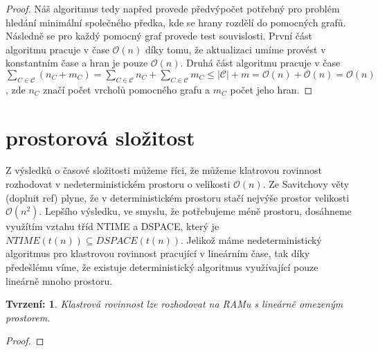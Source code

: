 \documentclass[12pt,a4report]{report}
\newtheorem{tvr}{Tvrzení: }[chapter]
\begin{document}
\begin{proof}
Náš algoritmus tedy napřed provede předvýpočet potřebný pro problém hledání minimální společného předka, kde se hrany rozdělí do pomocných grafů. Následně se pro každý pomocný graf provede test souvislosti. První část algoritmu pracuje v čase $\mathcal{O}(n)$ díky tomu, že aktualizaci umíme provést v konstantním čase a hran je pouze $\mathcal{O}(n)$. Druhá část algoritmu pracuje v čase $\sum\limits_{C \in \mathcal C}(n_C+m_C) = \sum\limits_{C \in \mathcal C}n_C + \sum\limits_{C \in \mathcal C}m_C \leq |\mathcal C| + m = \mathcal O(n) + \mathcal O(n)=\mathcal O(n)$, zde $n_C$ značí počet vrcholů pomocného grafu a $m_C$ počet jeho hran.
\end{proof}

\section{prostorová složitost}
Z výsledků o časové složitosti můžeme říci, že můžeme klatrovou rovinnost rozhodovat v nedeterministickém prostoru o velikosti $\mathcal{O}(n)$. Ze Savitchovy věty (doplnit ref) plyne, že v deterministickém prostoru stačí nejvýše prostor velikosti $\mathcal{O}(n^2)$.
Lepšího výsledku, ve smyslu, že potřebujeme méně prostoru, dosáhneme využítím vztahu tříd NTIME a DSPACE, který je $NTIME(t(n)) \subseteq DSPACE(t(n))$. Jelikož máme nedeterministický algoritmus pro klastrovou rovinnost pracující v lineárním čase, tak díky předešlému víme, že existuje deterministický algoritmus využívající pouze lineárně mnoho prostoru.
\begin{tvr}
Klastrová rovinnost lze rozhodovat na RAMu s lineárně omezeným prostorem.
\end{tvr}
\begin{proof}
\end{proof}
\end{document}
